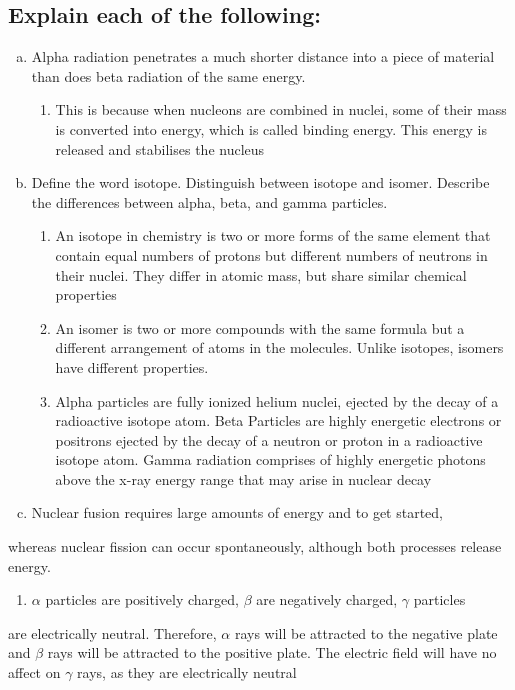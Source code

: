 \documentclass[11pt]{article}
\begin{document}
\subsection{Explain each of the following:}
\label{sec:orgbf69601}
\begin{enumerate}[(a)]
\item Alpha radiation penetrates a much shorter distance into a piece of material than does beta radiation of the same energy.
\begin{enumerate}
\item This is because when nucleons are combined in nuclei, some of their mass is converted into energy, which is called binding energy. This energy is released and stabilises the nucleus
\end{enumerate}

\item Define the word isotope. Distinguish between isotope and isomer. Describe the differences between alpha, beta, and gamma particles.
\begin{enumerate}
\item An isotope in chemistry is two or more forms of the same element that contain equal numbers of protons but different numbers of neutrons in their nuclei. They differ in atomic mass, but share similar chemical properties
\item An isomer is two or more compounds with the same formula but a different arrangement of atoms in the molecules. Unlike isotopes, isomers have different properties.
\item Alpha particles are fully ionized helium nuclei, ejected by the decay
of a radioactive isotope atom. Beta Particles are highly energetic
electrons or positrons ejected by the decay of a neutron or proton in a radioactive isotope atom. Gamma radiation comprises of highly energetic photons above the x-ray energy range that may arise in nuclear decay
\end{enumerate}

\item Nuclear fusion requires large amounts of energy and to get started,
\end{enumerate}
whereas nuclear fission can occur spontaneously, although both processes release energy.

\begin{enumerate}
\item \(\alpha\) particles are positively charged, \(\beta\) are negatively charged, \(\gamma\) particles
\end{enumerate}
are electrically neutral. Therefore, \(\alpha\) rays will be attracted to the
negative plate and \(\beta\) rays will be attracted to the positive plate. The
electric field will have no affect on \(\gamma\) rays, as they are electrically neutral
\end{document}
